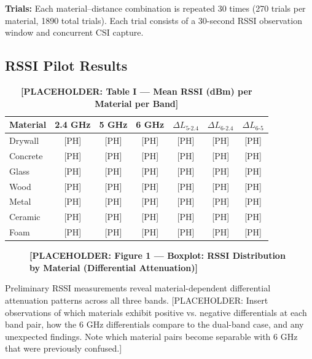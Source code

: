 \documentclass[conference]{IEEEtran}
\begin{document}
\textbf{Trials:} Each material–distance combination is repeated 30 times (270 trials per material, 1890 total trials). Each trial consists of a 30-second RSSI observation window and concurrent CSI capture.

\subsection{RSSI Pilot Results}

\begin{table}[t]
\centering
\caption{\textbf{[PLACEHOLDER: Table I — Mean RSSI (dBm) per Material per Band]}}
\label{tab:rssi-results}
\begin{tabular}{l|ccc|ccc}
\toprule
\textbf{Material} & \textbf{2.4 GHz} & \textbf{5 GHz} & \textbf{6 GHz} & \textbf{$\Delta L_{5\text{-}2.4}$} & \textbf{$\Delta L_{6\text{-}2.4}$} & \textbf{$\Delta L_{6\text{-}5}$} \\
\midrule
Drywall & [PH] & [PH] & [PH] & [PH] & [PH] & [PH] \\
Concrete & [PH] & [PH] & [PH] & [PH] & [PH] & [PH] \\
Glass & [PH] & [PH] & [PH] & [PH] & [PH] & [PH] \\
Wood & [PH] & [PH] & [PH] & [PH] & [PH] & [PH] \\
Metal & [PH] & [PH] & [PH] & [PH] & [PH] & [PH] \\
Ceramic & [PH] & [PH] & [PH] & [PH] & [PH] & [PH] \\
Foam & [PH] & [PH] & [PH] & [PH] & [PH] & [PH] \\
\bottomrule
\end{tabular}
\end{table}

\begin{figure}[t]
\centering
\caption{\textbf{[PLACEHOLDER: Figure 1 — Boxplot: RSSI Distribution by Material (Differential Attenuation)]}}
\label{fig:rssi-boxplot}
\end{figure}

Preliminary RSSI measurements reveal material-dependent differential attenuation patterns across all three bands. [PLACEHOLDER: Insert observations of which materials exhibit positive vs. negative differentials at each band pair, how the 6 GHz differentials compare to the dual-band case, and any unexpected findings. Note which material pairs become separable with 6 GHz that were previously confused.]
\end{document}
